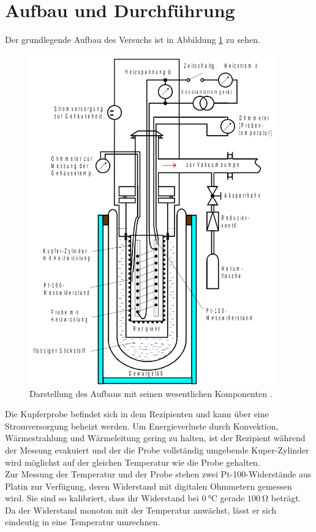 \section{Aufbau und Durchführung}
\label{sec:aufbauUndDurchfuehrung}

Der grundlegende Aufbau des Versuchs ist in Abbildung \ref{fig:aufbau} zu sehen.

\begin{figure}
  \centering
  \includegraphics[width=300pt]{data/aufbau.png}
  \caption{Darstellung des Aufbaus mit seinen wesentlichen Komponenten \cite{versuchsanleitung}.}
  \label{fig:aufbau}
\end{figure}

Die Kupferprobe befindet sich in dem Rezipienten und kann über eine Stromversorgung beheizt werden. Um Energieverluste durch Konvektion, Wärmestrahlung und Wärmeleitung gering zu halten, ist der Rezipient während der Messung evakuiert und der die Probe vollständig umgebende Kuper-Zylinder wird möglichst auf der gleichen Temperatur wie die Probe gehalten.\\
Zur Messung der Temperatur und der Probe stehen zwei Pt-100-Widerstände aus Platin zur Verfügung, deren Widerstand mit digitalen Ohmmetern gemessen wird. Sie sind so kalibriert, dass ihr Widerstand bei $\SI{0}{\celsius}$ gerade $\SI{100}{\ohm}$ beträgt. Da der Widerstand monoton mit der Temperatur anwächst, lässt er sich eindeutig in eine Temperatur umrechnen.

